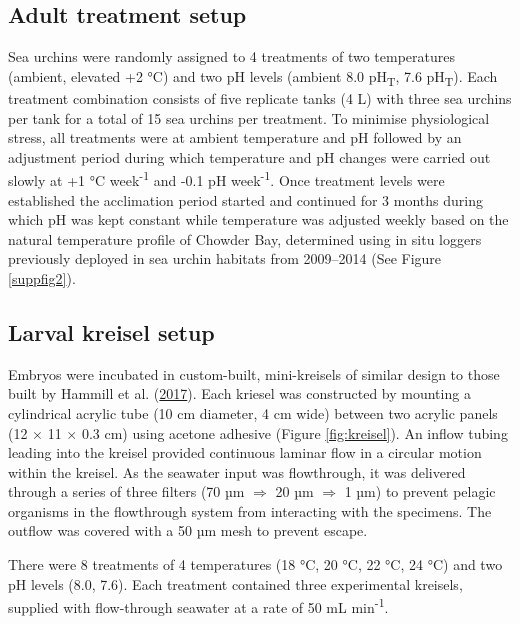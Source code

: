 \documentclass[a4paper,10pt, oneside]{memoir}
\begin{document}
\hypertarget{adult-treatment-setup}{%
\subsection{Adult treatment setup}\label{adult-treatment-setup}}

Sea urchins were randomly assigned to 4 treatments of two temperatures (ambient, elevated +2 °C) and two pH levels (ambient 8.0 pH\textsubscript{T}, 7.6 pH\textsubscript{T}).
Each treatment combination consists of five replicate tanks (4 L) with three sea urchins per tank for a total of 15 sea urchins per treatment.
To minimise physiological stress, all treatments were at ambient temperature and pH followed by an adjustment period during which temperature and pH changes were carried out slowly at +1 °C week\textsuperscript{-1} and -0.1 pH week\textsuperscript{-1}.
Once treatment levels were established the acclimation period started and continued for 3 months during which pH was kept constant while temperature was adjusted weekly based on the natural temperature profile of Chowder Bay, determined using in situ loggers previously deployed in sea urchin habitats from 2009--2014 (See Figure \ref{suppfig2}).

\hypertarget{larval-kreisel-setup}{%
\subsection{Larval kreisel setup}\label{larval-kreisel-setup}}

Embryos were incubated in custom-built, mini-kreisels of similar design to those built by Hammill et al. (\protect\hyperlink{ref-Hammill2017}{2017}).
Each kriesel was constructed by mounting a cylindrical acrylic tube (10 cm diameter, 4 cm wide) between two acrylic panels (12 \(\times\) 11 \(\times\) 0.3 cm) using acetone adhesive (Figure \ref{fig:kreisel}).
An inflow tubing leading into the kreisel provided continuous laminar flow in a circular motion within the kreisel.
As the seawater input was flowthrough, it was delivered through a series of three filters (70 µm \(\Rightarrow\) 20 µm \(\Rightarrow\) 1 µm) to prevent pelagic organisms in the flowthrough system from interacting with the specimens.
The outflow was covered with a 50 µm mesh to prevent escape.

There were 8 treatments of 4 temperatures (18 °C, 20 °C, 22 °C, 24 °C) and two pH levels (8.0, 7.6). Each treatment contained three experimental kreisels, supplied with flow-through seawater at a rate of 50 mL min\textsuperscript{-1}.
\end{document}
